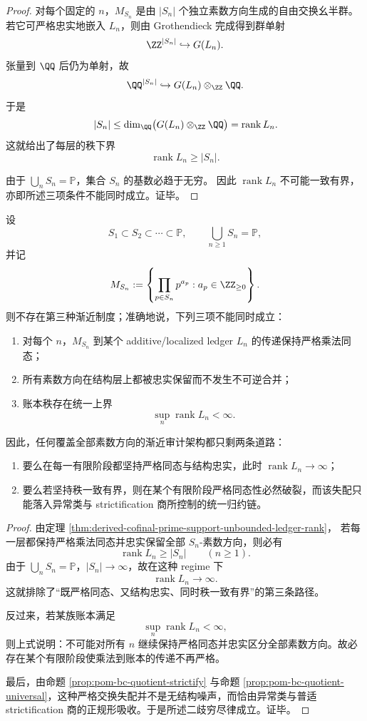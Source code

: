 \begin{proof}
对每个固定的 \(n\)，\(M_{S_n}\) 是由 \(|S_n|\) 个独立素数方向生成的自由交换幺半群。
若它可严格忠实地嵌入 \(L_n\)，则由 Grothendieck 完成得到群单射
\[
\ZZ^{|S_n|}\hookrightarrow G(L_n).
\]
张量到 \(\QQ\) 后仍为单射，故
\[
\QQ^{|S_n|}\hookrightarrow G(L_n)\otimes_{\ZZ}\QQ.
\]
于是
\[
|S_n|
\le
\dim_{\QQ}\bigl(G(L_n)\otimes_{\ZZ}\QQ\bigr)
=
\operatorname{rank}L_n.
\]
这就给出了每层的秩下界
\[
\operatorname{rank}L_n\ge |S_n|.
\]

由于 \(\bigcup_n S_n=\mathbb P\)，集合 \(S_n\) 的基数必趋于无穷。
因此 \(\operatorname{rank}L_n\) 不可能一致有界，亦即所述三项条件不能同时成立。证毕。
\end{proof}

\begin{theorem}[严格乘法账本的二歧穷尽律]\label{thm:derived-strict-multiplicative-ledger-binary-exhaustion}
设
\[
S_1\subset S_2\subset\cdots\subset \mathbb P,
\qquad
\bigcup_{n\ge 1}S_n=\mathbb P,
\]
并记
\[
M_{S_n}:=\left\{\prod_{p\in S_n}p^{a_p}:a_p\in \ZZ_{\ge 0}\right\}.
\]
则不存在第三种渐近制度；准确地说，下列三项不能同时成立：
\begin{enumerate}
\normalfont
  \item 对每个 \(n\)，\(M_{S_n}\) 到某个 additive/localized ledger \(L_n\) 的传递保持严格乘法同态；
  \item 所有素数方向在结构层上都被忠实保留而不发生不可逆合并；
  \item 账本秩存在统一上界
  \[
  \sup_n\operatorname{rank}L_n<\infty.
  \]
\end{enumerate}
因此，任何覆盖全部素数方向的渐近审计架构都只剩两条道路：
\begin{enumerate}
\normalfont
  \item 要么在每一有限阶段都坚持严格同态与结构忠实，此时 \(\operatorname{rank}L_n\to\infty\)；
  \item 要么若坚持秩一致有界，则在某个有限阶段严格同态性必然破裂，而该失配只能落入异常类与 strictification 商所控制的统一归约链。
\end{enumerate}
\end{theorem}

\begin{proof}
由定理 \ref{thm:derived-cofinal-prime-support-unbounded-ledger-rank}，
若每一层都保持严格乘法同态并忠实保留全部 \(S_n\)-素数方向，则必有
\[
\operatorname{rank}L_n\ge |S_n|
\qquad(n\ge 1).
\]
由于 \(\bigcup_n S_n=\mathbb P\)，\(|S_n|\to\infty\)，故在这种 regime 下
\[
\operatorname{rank}L_n\to\infty.
\]
这就排除了“既严格同态、又结构忠实、同时秩一致有界”的第三条路径。

反过来，若某族账本满足
\[
\sup_n\operatorname{rank}L_n<\infty,
\]
则上式说明：不可能对所有 \(n\) 继续保持严格同态并忠实区分全部素数方向。故必存在某个有限阶段使乘法到账本的传递不再严格。

最后，由命题 \ref{prop:pom-bc-quotient-strictify} 与命题 \ref{prop:pom-bc-quotient-universal}，这种严格交换失配并不是无结构噪声，而恰由异常类与普适 strictification 商的正规形吸收。于是所述二歧穷尽律成立。证毕。
\end{proof}

